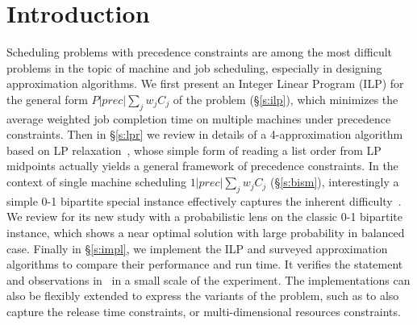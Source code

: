 \section{Introduction} \label{s:intro}
Scheduling problems with precedence constraints are among the most difficult
problems in the topic of machine and job scheduling, especially in designing
approximation algorithms. We first present an Integer Linear Program (ILP) for
the general form $P|prec|\sum_j w_jC_j$ of the problem (\S\ref{s:ilp}), which
minimizes the average weighted job completion time on multiple machines under
precedence constraints. Then in \S\ref{s:lpr} we review in details of a
4-approximation algorithm based on LP
relaxation~\cite{queyranne2006approximation}, whose simple form of reading a
list order from LP midpoints actually yields a general framework of
precedence constraints. In the context of single machine scheduling $1|prec|\sum_j w_jC_j$
(\S\ref{s:bism}), interestingly a simple 0-1 bipartite special instance
effectively captures the inherent
difficulty~\cite{woeginger2003approximability}. We review \cite{schulz2011near}
for its new study with a probabilistic lens on the classic 0-1 bipartite
instance, which shows a near optimal solution with large probability in balanced
case. Finally in \S\ref{s:impl}, we implement the ILP and surveyed approximation
algorithms to compare their performance and run time. It verifies the statement and observations in~\cite{schulz2011near} in a small scale of the experiment.
The implementations can also be flexibly extended to express the variants of the
problem, such as to also capture the release time constraints, or multi-dimensional resources constraints.

